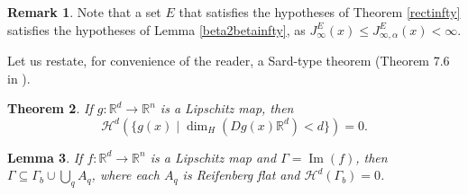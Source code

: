 \documentclass[11pt, twoside, leqno]{article}
\numberwithin{equation}{section}
\theoremstyle{plain}
\newtheorem{thm}{Theorem}[section]
\newtheorem{lem}[thm]{Lemma}
\theoremstyle{definition}
\newtheorem{rk}[thm]{Remark}
\newcommand{\R}{\mathbb{R}}
\renewcommand{\Im}{\operatorname{Im}} %
\begin{document}
\begin{rk}
Note that a set $E$ that satisfies the hypotheses of Theorem \ref{rectinfty} satisfies the hypotheses of Lemma \ref{beta2betainfty}, as  $J^{E}_{\infty}(x) \leq J^{E}_{\infty,\alpha}(x)<\infty$.
\end{rk}
 Let us restate, for convenience of the reader, a Sard-type theorem (Theorem 7.6 in \cite{mattila}).
 \begin{thm} \label{sard}
 If $g \colon \R^d \to \R^n$ is a Lipschitz map, then 
 \begin{equation}
     \mathcal{H}^d(\{g(x) \mid \dim_H (Dg(x)\R^d)< d\})=0.
 \end{equation}
 \end{thm}


\begin{lem} \label{lipccbp}
If $f \colon \R^d \to \R^n$ is a Lipschitz map and $\Gamma=\Im(f)$, then $\Gamma \subseteq \Gamma_b \cup \bigcup_q A_q$, where each $A_q$ is Reifenberg flat and $\mathcal{H}^d(\Gamma_b)=0$.
\end{lem}
\end{document}
